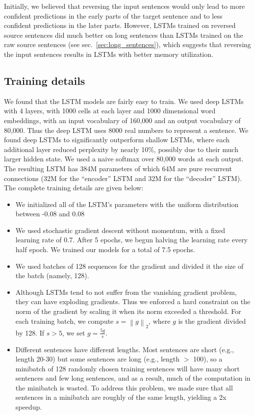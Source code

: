 \documentclass{article}
\begin{document}
Initially, we believed that reversing the input sentences would 
only lead to more confident predictions in the early parts of the target
sentence and to less confident predictions in the later parts.
However, LSTMs trained on reversed source sentences did much better on
long sentences than LSTMs trained on the raw source sentences (see
sec.~\ref{sec:long_sentences}), which suggests that reversing the
input sentences results in LSTMs with better memory utilization. 

\subsection{Training details}

We found that the LSTM models are fairly easy to train.  We used deep
LSTMs with 4 layers, with 1000 cells at each layer and 1000
dimensional word embeddings, with an input vocabulary of 160,000
and an output vocabulary of 80,000.  Thus the deep LSTM uses 8000 real 
numbers to represent a sentence. We found deep LSTMs to
significantly outperform shallow LSTMs, where each additional layer
reduced perplexity by nearly 10\%, possibly due to their much larger
hidden state.  We used a naive softmax over 80,000 words at each
output.  The resulting LSTM has 384M parameters of which 64M are pure
recurrent connections (32M for the ``encoder'' LSTM and 32M for the
``decoder'' LSTM). The complete training details are given below:
\begin{itemize}
\item We initialized all of the LSTM's parameters with the uniform distribution between
  -0.08 and 0.08
\item We used stochastic gradient descent without momentum,
  with a fixed learning rate of 0.7.  After 5 epochs, we begun
  halving the learning rate every half epoch.  We trained our models for a
  total of 7.5 epochs.
\item We used batches of 128 sequences for the gradient and divided it
  the size of the batch (namely, 128).
\item Although LSTMs tend to not suffer from the vanishing gradient
  problem, they can have exploding gradients.  Thus we enforced a hard
  constraint on the norm of the gradient
  \cite{graves13c,razvan} by scaling it when its norm exceeded
  a threshold. For each training batch, we compute $s =
  \left\|g\right\|_2$, where $g$ is the gradient divided by 128. If $s > 5$, we set
  $g = \frac{5g}{s}$.
\item Different sentences have different lengths.  Most sentences are
  short (e.g., length 20-30) but some sentences are long (e.g., length
  $>$ 100), so a minibatch of 128 randomly chosen training sentences
  will have many short sentences and few long sentences, and as a
  result, much of the computation in the minibatch is wasted.  To
  address this problem, we made sure that all sentences in a
  minibatch are roughly of the same length, yielding a 2x speedup.
\end{itemize}
\end{document}
